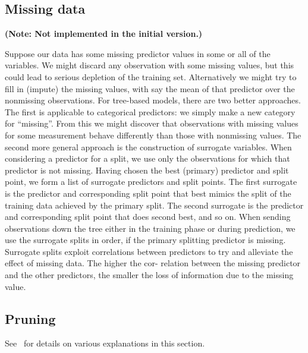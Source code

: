 \subsection{Missing data} %
\label{sub:missing_predictor_data}
\textbf{(Note: Not implemented in the initial version.)}

Suppose our data has some missing predictor values in some or all of the
variables. We might discard any observation with some missing values, but this
could lead to serious depletion of the training set. Alternatively we might try
to fill in (impute) the missing values, with say the mean of that predictor over
the nonmissing observations. For tree-based models, there are two better
approaches. The first is applicable to categorical predictors: we simply make a
new category for ``missing''. From this we might discover that observations with
missing values for some measurement behave differently than those with
non\-missing values. The second more general approach is the construction of
surrogate variables. When considering a predictor for a split, we use only the
observations for which that predictor is not missing. Having chosen the best
(primary) predictor and split point, we form a list of surrogate predictors and
split points. The first surrogate is the predictor and corresponding split point
that best mimics the split of the training data achieved by the primary split.
The second surrogate is the predictor and corresponding split point that does
second best, and so on. When sending observations down the tree either in the
training phase or during prediction, we use the surrogate splits in order, if
the primary splitting predictor is missing. Surrogate splits exploit
correlations between predictors to try and alleviate the effect of missing data.
The higher the cor- relation between the missing predictor and the other
predictors, the smaller the loss of information due to the missing value.


\subsection{Pruning} %
\label{sub:pruning}
See~\cite{hastie2008statisticallearning} for details on various explanations in
this section.

